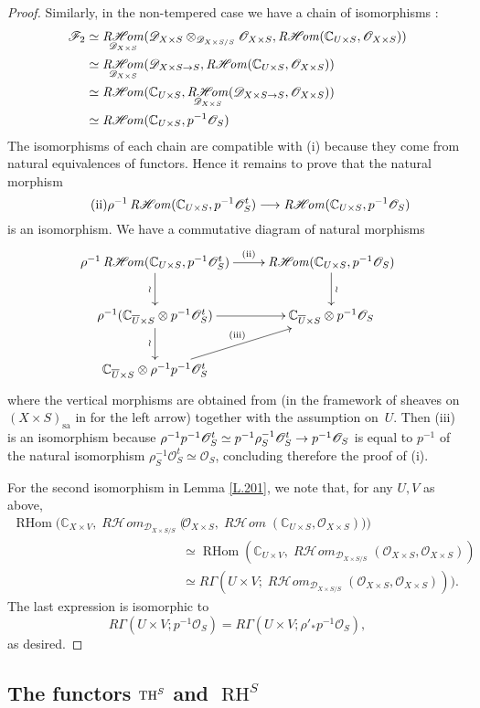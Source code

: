 \documentclass[english]{smfart}
\numberwithin{subsection}{section}
\def\shd{\mathcal{D}}\let\cD\shd
\def\shf{\mathcal{F}}\let\cF F
\def\sho{\mathcal{O}}\let\cO\sho
\newcommand{\C}{\mathbb{C}}\let\CC\C
\newcommand{\shhom}{\mathcal{H}\!\mathit{om}}\let\ho\shhom
\DeclareMathOperator{\rh}{\mathit{R}\shhom}
\DeclareMathOperator{\Rh}{\mathrm{RHom}}
\DeclareMathOperator{\RH}{RH}
\newcommand{\sa}{\mathrm{sa}}
\newcommand{\XS}{X\times S}
\newcommand{\DXS}{\shd_{\XS/S}}
\newcommand{\pOS}{p^{-1}\sho_S}
\numberwithin{equation}{section}
\theoremstyle{plain}
\theoremstyle{definition}
\def\to{\mathchoice{\longrightarrow}{\rightarrow}{\rightarrow}{\rightarrow}}
\begin{document}
\begin{proof}
Similarly, in the non-tempered case we have a chain of isomorphisms :
\begin{align*}
\shf_2
&\simeq\rh_{\shd_{\XS}}(\shd_{\XS}\otimes _{\DXS}\cO_{\XS}, \rh(\CC_{U\times S},\cO_{\XS}))\\
&\simeq\rh_{\shd_{\XS}}(\shd_{\XS\to S}, \rh(\CC_{U\times S},\cO_{\XS}))\\
&\simeq \rh(\CC_{U\times S}, \rh_{\shd_{\XS}}(\shd_{\XS\to S}, \cO_{\XS}))\\
&\simeq \rh(\CC_{U\times S}, \pOS)
\end{align*}
The isomorphisms of each chain are compatible with (i) because they come from natural equivalences of functors. Hence it remains to prove that
the natural morphism
\[
\tag{ii}\rho^{-1}\rh(\CC_{U\times S}, \pOS^t)\to\rh(\CC_{U\times S}, \pOS)
\]
is an isomorphism.
We have a commutative diagram of natural morphisms
\[
\xymatrix{
\rho^{-1}\rh(\CC_{U\times S}, \pOS^t)\ar[r]^-{(\text{ii})}\ar[d]_\wr&\rh(\CC_{U\times S}, \pOS)\ar[d]^\wr\\
\rho^{-1}(\C_{\overline{U}\times S}\otimes \pOS^t)\ar[r]\ar[d]_\wr&\C_{\overline{U}\times S}\otimes \pOS\\
\C_{\overline{U}\times S}\otimes \rho^{-1}\pOS^t \ar[ur]^-{(\text{iii})}&
}
\]
where the vertical morphisms are obtained from \hbox{\cite[Th.\,3.4.4]{K-S90}} (in the framework of sheaves on $(\XS)_\sa$ in \cite[Prop.\,5.3.9]{Prelli13} for the left arrow) together with the assumption on~$U$. Then (iii) is an isomorphism because $\rho^{-1}\pOS^t\simeq p^{-1}\rho_S^{-1}\sho^t_S\to \pOS$ is equal to $p^{-1}$ of the natural isomorphism $\rho_S^{-1}\sho^t_S\simeq\sho_S$, concluding therefore the proof of (i).

For the second isomorphism in Lemma \ref{L.201}, we note that, for any $U, V$ as above,
\begin{align*}
\Rh(\C_{X\times V}, \rh_{\DXS}(&\sho_{\XS},\rh(\C_{U \times S},\sho_{\XS})))\\
&\simeq \Rh(\C_{U\times V}, \rh_{\DXS}(\sho_{\XS},\sho_{\XS}))\\
&\simeq R\Gamma(U\times V; \rh_{\DXS}(\sho_{\XS},\sho_{\XS}))).
\end{align*}
The last expression is isomorphic to
$$
R\Gamma(U\times V; \pOS)=R\Gamma(U\times V; \rho'_*\pOS),
$$
as desired.
\end{proof}

\subsection{The functors $\operatorname{TH}^S$ and $\RH^S$}\label{subsec:RHTH}
\end{document}

